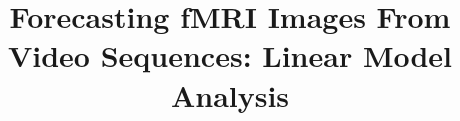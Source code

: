 \renewcommand{\shorttitle}{Forecasting fMRI Images From Video Sequences: Linear Model Analysis}

\title{Forecasting fMRI Images From Video Sequences: Linear Model Analysis}